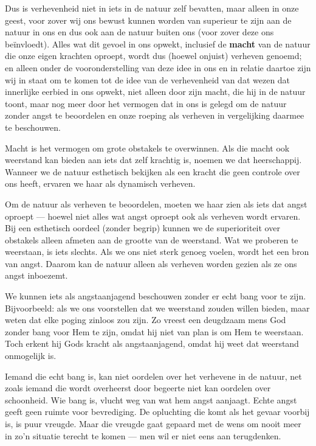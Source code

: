 Dus is verhevenheid niet in iets in de natuur zelf bevatten, maar alleen in onze geest, voor zover wij ons bewust kunnen worden van superieur te zijn aan de natuur in ons en dus ook aan de natuur buiten ons (voor zover deze ons beïnvloedt). Alles wat dit gevoel in ons opwekt, inclusief de \textbf{macht} van de natuur die onze eigen krachten oproept, wordt dus (hoewel onjuist) verheven genoemd; en alleen onder de vooronderstelling van deze idee in ons en in relatie daartoe zijn wij in staat om te komen tot de idee van de verhevenheid van dat wezen dat innerlijke eerbied in ons opwekt, niet alleen door zijn macht, die hij in de natuur toont, maar nog meer door het vermogen dat in ons is gelegd om de natuur zonder angst te beoordelen en onze roeping als verheven in vergelijking daarmee te beschouwen.

\begin{mdframed}[leftmargin=0pt,rightmargin=0pt,backgroundcolor=blue!6,linecolor=white,innertopmargin=6pt,innerbottommargin=6pt]

Macht is het vermogen om grote obstakels te overwinnen. Als die macht ook weerstand kan bieden aan iets dat zelf krachtig is, noemen we dat heerschappij. Wanneer we de natuur esthetisch bekijken als een kracht die geen controle over ons heeft, ervaren we haar als dynamisch verheven.

Om de natuur als verheven te beoordelen, moeten we haar zien als iets dat angst oproept — hoewel niet alles wat angst oproept ook als verheven wordt ervaren. Bij een esthetisch oordeel (zonder begrip) kunnen we de superioriteit over obstakels alleen afmeten aan de grootte van de weerstand. Wat we proberen te weerstaan, is iets slechts. Als we ons niet sterk genoeg voelen, wordt het een bron van angst. Daarom kan de natuur alleen als verheven worden gezien als ze ons angst inboezemt.

We kunnen iets als angstaanjagend beschouwen zonder er echt bang voor te zijn. Bijvoorbeeld: als we ons voorstellen dat we weerstand zouden willen bieden, maar weten dat elke poging zinloos zou zijn. Zo vreest een deugdzaam mens God zonder bang voor Hem te zijn, omdat hij niet van plan is om Hem te weerstaan. Toch erkent hij Gods kracht als angstaanjagend, omdat hij weet dat weerstand onmogelijk is.

Iemand die echt bang is, kan niet oordelen over het verhevene in de natuur, net zoals iemand die wordt overheerst door begeerte niet kan oordelen over schoonheid. Wie bang is, vlucht weg van wat hem angst aanjaagt. Echte angst geeft geen ruimte voor bevrediging. De opluchting die komt als het gevaar voorbij is, is puur vreugde. Maar die vreugde gaat gepaard met de wens om nooit meer in zo’n situatie terecht te komen — men wil er niet eens aan terugdenken.


\end{mdframed}
